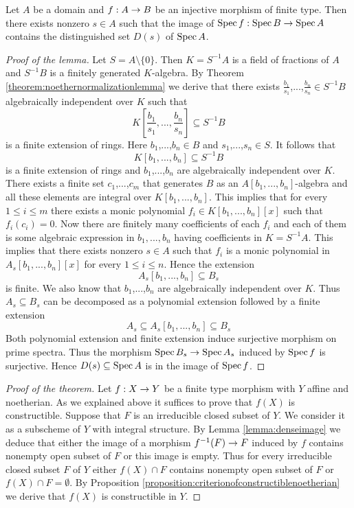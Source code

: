 \begin{lemma}\label{lemma:denseimage}
Let $A$ be a domain and $f:A\rightarrow B$ be an injective morphism of finite type. Then there exists nonzero $s\in A$ such that the image of $\mathrm{Spec}\, f:\mathrm{Spec}\, B\rightarrow \mathrm{Spec}\, A$ contains the distinguished set $D(s)$ of $\mathrm{Spec}\, A$.
\end{lemma}
\begin{proof}[Proof of the lemma]
Let $S = A\setminus \{0\}$. Then $K = S^{-1}A$ is a field of fractions of $A$ and $S^{-1}B$ is a finitely generated $K$-algebra. By Theorem \ref{theorem:noethernormalizationlemma} we derive that there exists $\frac{b_1}{s_1}$,...,$\frac{b_n}{s_n}\in S^{-1}B$ algebraically independent over $K$ such that 
$$K\left[\frac{b_1}{s_1},...,\frac{b_n}{s_n}\right]\subseteq S^{-1}B$$
is a finite extension of rings. Here $b_1$,...,$b_n\in B$ and $s_1$,...,$s_n\in S$. It follows that 
$$K\left[b_1,...,b_n\right]\subseteq S^{-1}B$$
is a finite extension of rings and $b_1$,...,$b_n$ are algebraically independent over $K$. There exists a finite set $c_1$,...,$c_m$ that generates $B$ as an $A\left[b_1,...,b_n\right]$-algebra and all these elements are integral over $K\left[b_1,...,b_n\right]$. This implies that for every $1\leq i\leq m$ there exists a monic polynomial $f_i\in K\left[b_1,...,b_n\right][x]$ such that $f_i(c_i)=0$. Now there are finitely many coefficients of each $f_i$ and each of them is some algebraic expression in $b_1,...,b_n$ having coefficients in $K = S^{-1}A$. This implies that there exists nonzero $s\in A$ such that $f_i$ is a monic polynomial in $A_s[b_1,...,b_n][x]$ for every $1\leq i\leq n$. Hence the extension 
$$A_s[b_1,...,b_n]\subseteq B_s$$ 
is finite. We also know that $b_1$,...,$b_n$ are algebraically independent over $K$. Thus $A_s\subseteq B_s$ can be decomposed as a polynomial extension followed by a finite extension
$$A_s\subseteq A_s[b_1,...,b_n]\subseteq B_s$$
Both polynomial extension and finite extension induce surjective morphism on prime spectra. Thus the morphism $\mathrm{Spec}\, B_s\rightarrow \mathrm{Spec}\, A_s$ induced by $\mathrm{Spec}\, f$ is surjective. Hence $D(s)\subseteq \mathrm{Spec}\, A$ is in the image of $\mathrm{Spec}\, f$.
\end{proof}

\begin{proof}[Proof of the theorem]
Let $f:X\rightarrow Y$ be a finite type morphism with $Y$ affine and noetherian. As we explained above it suffices to prove that $f(X)$ is constructible. Suppose that $F$ is an irreducible closed subset of $Y$. We consider it as a subscheme of $Y$ with integral structure. By Lemma \ref{lemma:denseimage} we deduce that either the image of a morphism $f^{-1}(F)\rightarrow F$ induced by $f$ contains nonempty open subset of $F$ or this image is empty. Thus for every irreducible closed subset $F$ of $Y$ either $f(X)\cap F$ contains nonempty open subset of $F$ or $f(X)\cap F = \emptyset$. By Proposition \ref{proposition:criterionofconstructiblenoetherian} we derive that $f(X)$ is constructible in $Y$.
\end{proof}

